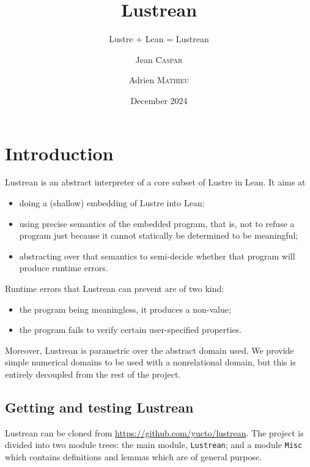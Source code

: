 \documentclass{scrartcl}
\title{Lustrean}
\subtitle{Lustre + Lean = Lustrean}
\author{Jean \textsc{Caspar} \and Adrien \textsc{Mathieu}}
\date{December 2024}
\begin{document}
\maketitle
\tableofcontents

\pagebreak

\section*{Introduction}
Lustrean is an abstract interpreter of a core subset of Lustre in Lean.  It aims at
\begin{itemize}
\item doing a (shallow) embedding of Lustre into Lean;
\item using precise semantics of the embedded program, that is, not to refuse a program just
  because it cannot statically be determined to be meaningful;
\item abstracting over that semantics to semi-decide whether that program will produce runtime
  errors.
\end{itemize}
Runtime errors that Lustrean can prevent are of two kind:
\begin{itemize}
\item the program being meaningless, it produces a non-value;
\item the program fails to verify certain user-specified properties.
\end{itemize}

Moreover, Lustrean is parametric over the abstract domain used.  We provide simple numerical
domains to be used with a nonrelational domain, but this is entirely decoupled from the rest of
the project.

\subsection*{Getting and testing Lustrean}
Lustrean can be cloned from \url{https://github.com/yucto/lustrean}.  The project is divided into
two module trees: the main module, \texttt{Lustrean}; and a module \texttt{Misc} which contains
definitions and lemmas which are of general purpose.
\end{document}
